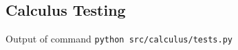 \subsection{Calculus Testing}\label{ssec:appendix-calculus-tests}
    Output of command \texttt{python src/calculus/tests.py}
